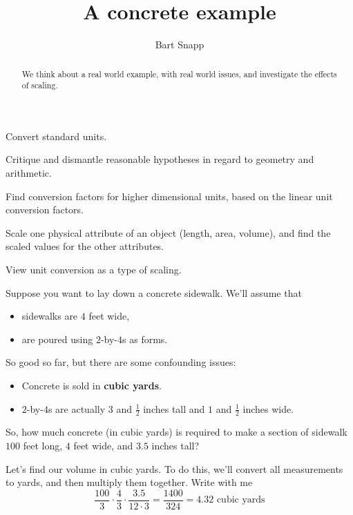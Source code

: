 \documentclass[handout,nooutcomes,noauthor,12pt]{ximera}
\title{A concrete example}
\author{Bart Snapp}
\begin{document}
\begin{abstract}
  We think about a real world example, with real world issues, and
  investigate the effects of scaling.
\end{abstract}
\maketitle


\begin{listOutcomes}
\item Convert standard units.
\item Critique and dismantle reasonable hypotheses in regard to
  geometry and arithmetic.
\item Find conversion factors for higher dimensional units, based on
  the linear unit conversion factors.
\item Scale one physical attribute of an object (length, area,
  volume), and find the scaled values for the other attributes.
\item View unit conversion as a type of scaling.
\end{listOutcomes}



\mynewpage



\begin{question}
  Suppose you want to lay down a concrete sidewalk. We'll assume that
  \begin{itemize}
  \item sidewalks are $4$ feet wide,
  \item are poured using $2$-by-$4$s as forms.
  \end{itemize}
  So good so far, but there are some confounding issues:
  \begin{itemize}
  \item Concrete is sold in \textbf{cubic yards}.
  \item $2$-by-$4$s are actually $3$ and $\frac{1}{2}$ inches tall and
    $1$ and $\frac{1}{2}$ inches wide.
  \end{itemize}
  So, how much concrete (in cubic yards) is required to make a section
  of sidewalk $100$ feet long, $4$ feet wide, and $3.5$ inches tall?
  \begin{freeResponse}
    Let's find our volume in cubic yards. To do this, we'll convert
    all measurements to yards, and then multiply them together. Write with me
    \[
    \frac{100}{3} \cdot \frac{4}{3}\cdot \frac{3.5}{12\cdot 3} = \frac{1400}{324} = 4.32 \text{ cubic yards}
    \] 
  \end{freeResponse}
\end{question}
\mynewpage
\end{document}

